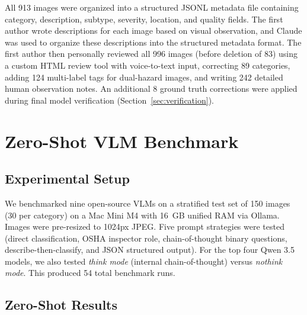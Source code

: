 \documentclass[12pt, a4paper]{article}
\begin{document}
All 913 images were organized into a structured JSONL metadata file containing category, description, subtype, severity, location, and quality fields. The first author wrote descriptions for each image based on visual observation, and Claude was used to organize these descriptions into the structured metadata format. The first author then personally reviewed all 996 images (before deletion of 83) using a custom HTML review tool with voice-to-text input, correcting 89 categories, adding 124 multi-label tags for dual-hazard images, and writing 242 detailed human observation notes. An additional 8 ground truth corrections were applied during final model verification (Section~\ref{sec:verification}).

\section{Zero-Shot VLM Benchmark}
\label{sec:benchmark}

\subsection{Experimental Setup}

We benchmarked nine open-source VLMs on a stratified test set of 150 images (30 per category) on a Mac Mini M4 with 16~GB unified RAM via Ollama. Images were pre-resized to 1024px JPEG. Five prompt strategies were tested (direct classification, OSHA inspector role, chain-of-thought binary questions, describe-then-classify, and JSON structured output). For the top four Qwen 3.5 models, we also tested \textit{think mode} (internal chain-of-thought) versus \textit{nothink mode}. This produced 54 total benchmark runs.

\subsection{Zero-Shot Results}
\end{document}
